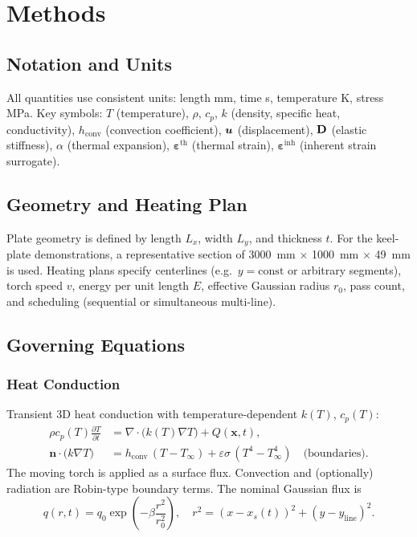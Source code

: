 \section{Methods}
\label{sec:methods}

\subsection{Notation and Units}
All quantities use consistent units: length \si{mm}, time \si{s}, temperature \si{K}, stress \si{MPa}. Key symbols: $T$ (temperature), $\rho$, $c_p$, $k$ (density, specific heat, conductivity), $h_{\mathrm{conv}}$ (convection coefficient), $\boldsymbol{u}$ (displacement), $\mathbf{D}$ (elastic stiffness), $\alpha$ (thermal expansion), $\boldsymbol{\varepsilon}^{\mathrm{th}}$ (thermal strain), $\boldsymbol{\varepsilon}^{\mathrm{inh}}$ (inherent strain surrogate).

\subsection{Geometry and Heating Plan}
Plate geometry is defined by length $L_x$, width $L_y$, and thickness $t$. For the keel-plate demonstrations, a representative section of \SI{3000}{mm} $\times$ \SI{1000}{mm} $\times$ \SI{49}{mm} is used. Heating plans specify centerlines (e.g.\ $y = \mathrm{const}$ or arbitrary segments), torch speed $v$, energy per unit length $E$, effective Gaussian radius $r_0$, pass count, and scheduling (sequential or simultaneous multi-line).

\subsection{Governing Equations}

\subsubsection{Heat Conduction}
Transient 3D heat conduction with temperature-dependent $k(T)$, $c_p(T)$:
\begin{align}
\rho c_p(T) \frac{\partial T}{\partial t} &= \nabla \cdot \bigl(k(T) \nabla T\bigr) + Q(\mathbf{x},t), \\
\mathbf{n}\cdot \bigl(k\nabla T\bigr) &= h_{\mathrm{conv}}\,(T - T_{\infty}) + \varepsilon\sigma\,(T^4 - T_{\infty}^4)\quad \text{(boundaries)}.
\end{align}
The moving torch is applied as a surface flux. Convection and (optionally) radiation are Robin-type boundary terms. The nominal Gaussian flux is
\begin{equation}
q(r,t) = q_0 \exp\left(-\beta \frac{r^2}{r_0^2}\right),\quad r^2 = (x-x_s(t))^2 + (y-y_{\mathrm{line}})^2.
\end{equation}

